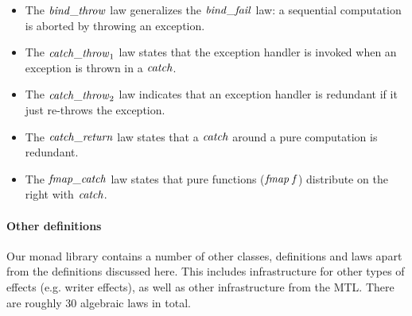 \begin{itemize}
\item The \ensuremath{\Varid{bind\char95 throw}} law generalizes the \ensuremath{\Varid{bind\char95 fail}} law: a sequential
      computation is aborted by throwing an exception.
\item The \ensuremath{\Varid{catch\char95 throw}_{1}} law states that the exception handler is invoked
      when an exception is thrown in a \ensuremath{\Varid{catch}}.
\item The \ensuremath{\Varid{catch\char95 throw}_{2}} law indicates that an exception handler is redundant
      if it just re-throws the exception.
\item The \ensuremath{\Varid{catch\char95 return}} law states that a \ensuremath{\Varid{catch}} around a pure computation is redundant.
\item The \ensuremath{\Varid{fmap\char95 catch}} law states that pure functions (\ensuremath{\Varid{fmap}\;\Varid{f}}) distribute on the right
      with \ensuremath{\Varid{catch}}. %
\end{itemize}


\paragraph{Other definitions} Our monad library contains a number of
other classes, definitions and laws apart from the definitions
discussed here. This includes infrastructure for other types of
effects (e.g. writer effects), as well as other infrastructure from
the MTL.  There are roughly 30 algebraic laws in total.

